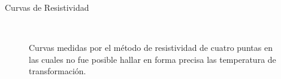 \documentclass[11pt]{beamer}
\begin{document}
		\begin{frame}{Curvas de Resistividad}
			\begin{figure}[H]
			\captionsetup[subfloat]{labelformat=empty}
				\centering
				 \qquad
				\\
				\caption*{Curvas medidas por el método de resistividad de cuatro puntas en las cuales no fue posible hallar en forma precisa las temperatura de transformación.}
				\label{Failures}
			\end{figure}
		\end{frame}
		
\end{document}
